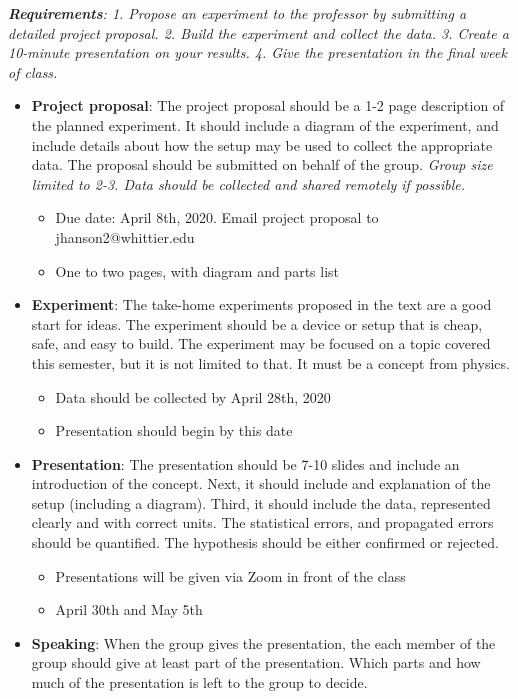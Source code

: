 \documentclass[10pt]{article}
\begin{document}
\maketitle

\noindent
\textit{\textbf{Requirements}: 1. Propose an experiment to the professor by submitting a detailed project proposal.  2. Build the experiment and collect the data.  3. Create a 10-minute presentation on your results.  4. Give the presentation in the final week of class.} \\
\begin{itemize}
\item\textbf{ Project proposal}: The project proposal should be a 1-2 page description of the planned experiment.  It should include a diagram of the experiment, and include details about how the setup may be used to collect the appropriate data.  The proposal should be submitted on behalf of the group.  \textit{Group size limited to 2-3.  Data should be collected and shared remotely if possible.}
\begin{itemize}
\item Due date: April 8th, 2020.  Email project proposal to jhanson2@whittier.edu
\item One to two pages, with diagram and parts list
\end{itemize}
\item \textbf{Experiment}: The take-home experiments proposed in the text are a good start for ideas.  The experiment should be a device or setup that is cheap, safe, and easy to build.  The experiment may be focused on a topic covered this semester, but it is not limited to that.  It must be a concept from physics.
\begin{itemize}
\item Data should be collected by April 28th, 2020
\item Presentation should begin by this date
\end{itemize}
\item \textbf{Presentation}: The presentation should be 7-10 slides and include an introduction of the concept.  Next, it should include and explanation of the setup (including a diagram).  Third, it should include the data, represented clearly and with correct units.  The statistical errors, and propagated errors should be quantified.  The hypothesis should be either confirmed or rejected.
\begin{itemize}
\item Presentations will be given via Zoom in front of the class
\item April 30th and May 5th
\end{itemize}
\item \textbf{Speaking}: When the group gives the presentation, the each member of the group should give at least part of the presentation.  Which parts and how much of the presentation is left to the group to decide.
\end{itemize}
\end{document}
